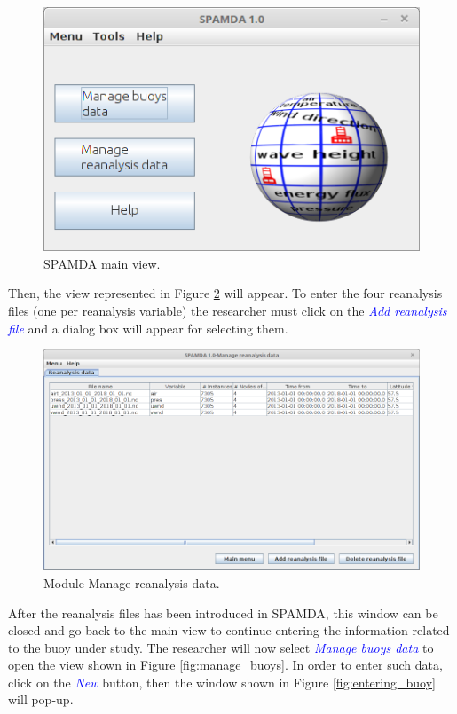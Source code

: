\begin{onehalfspace}
			\begin{figure}[ht]
				\centering
				\includegraphics[scale=0.48]{figures/mainView.png}
				\caption{SPAMDA main view.}\label{fig:main_view}
			\end{figure}

			Then, the view represented in Figure \ref{fig:reanalysis} will appear. To enter the four reanalysis files (one per reanalysis variable) the researcher must click on the \textcolor{blue}{\textit{Add reanalysis file}} and a dialog box will appear for selecting them.
			
			\begin{figure}[ht!]
				\centering
				\includegraphics[scale=0.40]{figures/manageReanalysisData_CS.png}
				\caption{Module Manage reanalysis data.}\label{fig:reanalysis}
			\end{figure}
			
			After the reanalysis files has been introduced in SPAMDA, this window can be closed and go back to the main view to continue entering the information related to the buoy under study. The researcher will now select \textcolor{blue}{\textit{Manage buoys data}} to open the view shown in Figure \ref{fig:manage_buoys}. In order to enter such data, click on the \textcolor{blue}{\textit{New}} button, then the window shown in Figure \ref{fig:entering_buoy} will pop-up.
			

\end{onehalfspace}
